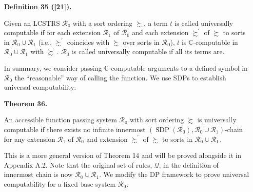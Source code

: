 \documentclass[10pt,a4paper]{amsart}
\begin{document}
 
 
\par\medskip\noindent\textbf{Definition 35 ([21]).}\par
 
 
Given an LCSTRS $\mathcal{R}_{0}$ with a sort ordering $\succsim$, a term $t$ is called universally computable if for each extension $\mathcal{R}_{1}$ of $\mathcal{R}_{0}$ and each extension $\succsim^{\prime}$ of $\succsim$ to sorts in $\mathcal{R}_{0}\cup\mathcal{R}_{1}$ (i.e., $\succsim^{\prime}$ coincides with $\succsim$ over sorts in $\mathcal{R}_{0}$), $t$ is $\mathbb{C}$-computable in $\mathcal{R}_{0}\cup\mathcal{R}_{1}$ with $\succsim^{\prime}$. $\mathcal{R}_{0}$ is called universally computable if all its terms are.\par
 
 
 
 
In summary, we consider passing $\mathbb{C}$-computable arguments to a defined symbol in $\mathcal{R}_{0}$ the “reasonable” way of calling the function. We use SDPs to establish universal computability:\par
 
 
 
\par\medskip\noindent\textbf{Theorem 36.}\par
 
 
An accessible function passing system $\mathcal{R}_{0}$ with sort ordering $\succsim$ is universally computable if there exists no infinite innermost $(\operatorname{SDP}(\mathcal{R}_{0}),\mathcal{R}_{0}\cup\mathcal{R}_{1})$-chain for any extension $\mathcal{R}_{1}$ of $\mathcal{R}_{0}$ and extension $\succsim^{\prime}$ of $\succsim$ to sorts in $\mathcal{R}_{0}\cup\mathcal{R}_{1}$.\par
 
 
 
 
This is a more general version of Theorem 14 and will be proved alongside it in Appendix A.2. Note that the original set of rules, $\mathcal{Q}$, in the definition of innermost chain is now $\mathcal{R}_{0}\cup\mathcal{R}_{1}$. We modify the DP framework to prove universal computability for a fixed base system $\mathcal{R}_{0}$.\par
 
\end{document}
